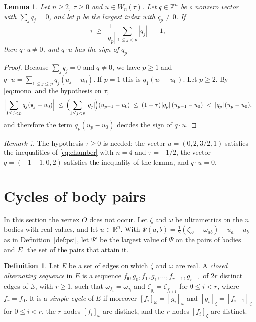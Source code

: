 \documentclass[11pt]{amsart}
\newtheorem{lemma}[theorem]{Lemma}
\theoremstyle{definition}
\newtheorem{definition}[theorem]{Definition}
\theoremstyle{remark}
\newtheorem{remark}[theorem]{Remark}
\numberwithin{equation}{section}
\newcommand{\RR}{\mathbb{R}}
\newcommand{\ZZ}{\mathbb{Z}}
\newcommand{\Po}{\Psi^{\circ}}
\newcommand{\Eo}{E^{\circ}}
\newcommand{\nd}[2]{[#1]_{#2}}
\begin{document}
\begin{lemma}\label{lem:B}
Let $n \ge 2$, $\tau \ge 0$ and $u \in W_n(\tau)$. Let $q \in \ZZ^n$ be a nonzero vector with
$\sum_j q_j = 0$, and let $p$ be the largest index with $q_p \ne 0$. If
\[
  \tau \;\ge\; \frac{1}{|q_p|} \sum_{1 \le j < p} |q_j| \;-\; 1 ,
\]
then $q \cdot u \ne 0$, and $q \cdot u$ has the sign of $q_p$.
\end{lemma}

\begin{proof}
Because $\sum_j q_j = 0$ and $q \ne 0$, we have $p \ge 1$ and
$q \cdot u = \sum_{1 \le j \le p} q_j (u_j - u_0)$. If $p = 1$ this is $q_1 (u_1 - u_0)$. Let $p \ge 2$.
By \eqref{eq:mono} and the hypothesis on $\tau$,
\[
  \Bigl| \sum_{1 \le j < p} q_j (u_j - u_0) \Bigr|
  \;\le\; \Bigl( \sum_{1 \le j < p} |q_j| \Bigr) (u_{p-1} - u_0)
  \;\le\; (1 + \tau)\, |q_p|\, (u_{p-1} - u_0) \;<\; |q_p|\, (u_p - u_0) ,
\]
and therefore the term $q_p (u_p - u_0)$ decides the sign of $q \cdot u$.
\end{proof}

\begin{remark}\label{rem:tau}
The hypothesis $\tau \ge 0$ is needed: the vector $u = (0, 2, 3/2, 1)$ satisfies the inequalities of
\eqref{eq:chamber} with $n = 4$ and $\tau = -1/2$, the vector $q = (-1, -1, 0, 2)$ satisfies the inequality of the lemma, and $q \cdot u = 0$.
\end{remark}

\section{Cycles of body pairs}\label{sec:C}

In this section the vertex $O$ does not occur. Let $\zeta$ and $\omega$ be ultrametrics on the $n$
bodies with real values, and let $u \in \RR^n$. With
$\Psi(a, b) = \tfrac12(\zeta_{ab} + \omega_{ab}) - u_a - u_b$ as in Definition~\ref{def:psi}, let $\Po$
be the largest value of $\Psi$ on the pairs of bodies and $\Eo$ the set of the pairs that attain it.

\begin{definition}\label{def:alt}
Let $E$ be a set of edges on which $\zeta$ and $\omega$ are real. A \emph{closed alternating sequence}
in $E$ is a sequence $f_0, g_0, f_1, g_1, \dots, f_{r-1}, g_{r-1}$ of $2r$ distinct edges of $E$, with
$r \ge 1$, such that $\omega_{f_i} = \omega_{g_i}$ and $\zeta_{g_i} = \zeta_{f_{i+1}}$ for
$0 \le i < r$, where $f_r = f_0$. It is a \emph{simple cycle} of $E$ if moreover
$\nd{f_i}{\omega} = \nd{g_i}{\omega}$ and $\nd{g_i}{\zeta} = \nd{f_{i+1}}{\zeta}$ for $0 \le i < r$,
the $r$ nodes $\nd{f_i}{\omega}$ are distinct, and the $r$ nodes $\nd{f_i}{\zeta}$ are distinct.
\end{definition}
\end{document}
